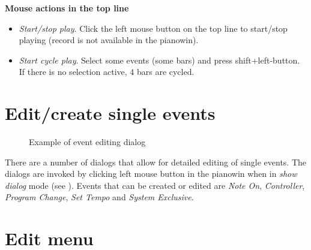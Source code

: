 \documentclass[letterpaper]{report}
\begin{document}
{\bf Mouse actions in the top line}

\begin{itemize}
\item {\em Start/stop play}. Click the left mouse button on the top line to
start/stop playing (record is not available in the pianowin).
\item {\em Start cycle play}. Select some events (some bars) and press
shift+left-button. If there is no selection active, 4 bars are cycled.
\end{itemize}


\section{Edit/create single events}\label{pweventedit}

\begin{figure}
\caption{Example of event editing dialog}
\end{figure}

There are a number of dialogs that allow for detailed editing of single events.
The dialogs are invoked by clicking left mouse button in the pianowin when
in {\em show dialog} mode (see ). Events that
can be created or edited are {\em Note On}, {\em Controller},
{\em Program Change}, {\em Set Tempo} and {\em System Exclusive}.


\section{Edit menu}
\end{document}
